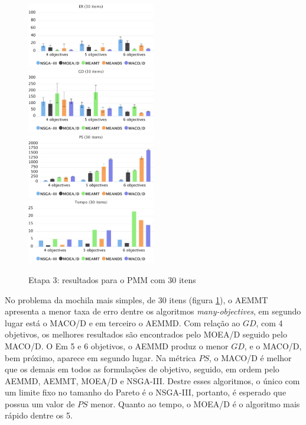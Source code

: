 \begin{figure}[!htbp]
	\caption{Etapa 3: resultados para o PMM com 30 itens}
	\label{fig_exp3_pmm_30}
	\includegraphics[width=0.5\textwidth]{cap_experimentos/figs/etapa3/er-mkp-30}
	\includegraphics[width=0.5\textwidth]{cap_experimentos/figs/etapa3/gd-mkp-30}
	\includegraphics[width=0.5\textwidth]{cap_experimentos/figs/etapa3/ps-mkp-30}
	\includegraphics[width=0.5\textwidth]{cap_experimentos/figs/etapa3/time-mkp-30}
\end{figure}

No problema da mochila mais simples, de 30 itens (figura \ref{fig_exp3_pmm_30}), o AEMMT apresenta a menor taxa de erro dentre os algoritmos \textit{many-objectives}, em segundo lugar está o MACO/D e em terceiro o AEMMD. Com relação ao $GD$, com 4 objetivos, os melhores resultados são encontrados pelo MOEA/D seguido pelo MACO/D. O Em 5 e 6 objetivos, o AEMMD produz o menor $GD$, e o MACO/D, bem próximo, aparece em segundo lugar. Na métrica $PS$, o MACO/D é melhor que os demais em todos as formulações de objetivo, seguido, em ordem pelo AEMMD, AEMMT, MOEA/D e NSGA-III. Destre esses algoritmos, o único com um limite fixo no tamanho do Pareto é o NSGA-III, portanto, é esperado que possua um valor de $PS$ menor. Quanto ao tempo, o MOEA/D é o algoritmo mais rápido dentre os 5.

